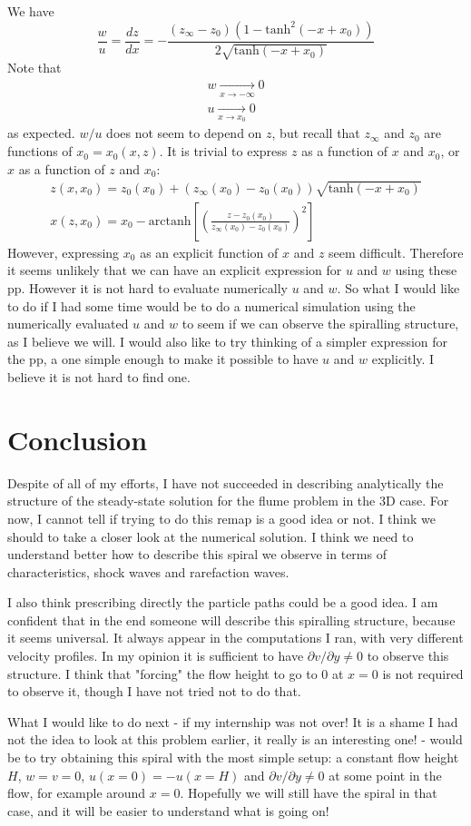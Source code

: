 \documentclass[11pt]{article}
\begin{document}
We have
\[
\frac{w}{u} = \frac{dz}{dx} = -\frac{(z_\infty - z_0)\left(1-\text{tanh}^2(-x+x_0)\right)}
		{2\sqrt{\text{tanh}(-x+x_0)}}
\]
Note that 
\[
\begin{matrix}
w  \xrightarrow[x \rightarrow -\infty]{} 0 \\
u  \xrightarrow[x \rightarrow x_0]{} 0
\end{matrix}
\]
as expected.
$w/u$ does not seem to depend on $z$, but recall that $z_\infty$ and $z_0$ are functions of $x_0 = x_0(x,z)$.
It is trivial to express $z$ as a function of $x$ and $x_0$, or $x$ as a function of $z$ and $x_0$:
\[
\begin{matrix}
z(x, x_0) = z_0(x_0) + (z_\infty(x_0) - z_0(x_0)) \sqrt {\text{tanh} (-x + x_0)} \\
x(z, x_0) = x_0 - \text{arctanh} \left[ \left( \frac{z - z_0(x_0)}{z_\infty(x_0) - z_0(x_0)} \right)^2 \right]
\end{matrix}
\]
However, expressing $x_0$ as an explicit function of $x$ and $z$ seem difficult.
Therefore it seems unlikely that we can have an explicit expression for $u$ and $w$ using these pp. However it is not hard to evaluate numerically $u$ and $w$. So what I would like to do if I had some time would be to do a numerical simulation using the numerically evaluated $u$ and $w$ to seem if we can observe the spiralling structure, as I believe we will. I would also like to try thinking of a simpler expression for the pp, a one simple enough to make it possible to have $u$ and $w$ explicitly. I believe it is not hard to find one. 

\section{Conclusion}

Despite of all of my efforts, I have not succeeded in describing analytically the structure of the steady-state solution for the flume problem in the 3D case. 
For now, I cannot tell if trying to do this remap is a good idea or not.
I think we should to take a closer look at the numerical solution.
I think we need to understand better how to describe this spiral we observe in terms of characteristics, shock waves and rarefaction waves.

I also think prescribing directly the particle paths could be a good idea. I am confident that in the end someone will describe this spiralling structure, because it seems universal. It always appear in the computations I ran, with very different velocity profiles. In my opinion it is sufficient to have $\partial v / \partial y \neq 0$ to observe this structure. I think that "forcing" the flow height to go to $0$ at $x=0$ is not required to observe it, though I have not tried not to do that.

What I would like to do next - if my internship was not over! It is a shame I had not the idea to look at this problem earlier, it really is an interesting one! - would be to try obtaining this spiral with the most simple setup: a constant flow height $H$, $w=v=0$, $ u ( x = 0 ) = - u ( x = H ) $ and $\partial v / \partial y \neq 0$ at some point in the flow, for example around $x = 0$.
Hopefully we will still have the spiral in that case, and it will be easier to understand what is going on!
\end{document}
